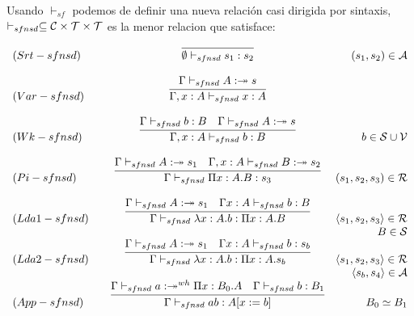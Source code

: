 \begin{definition}
Usando $\vdash_{sf}$ podemos de definir una nueva relación casi dirigida por sintaxis, $\vdash_{sfnsd} \subseteq \mathcal{C}\times\mathcal{T}\times\mathcal{T}$ es la
menor relacion que satisface:


\[
\begin{array}{llcr}
	(Srt-sfnsd) & &\infer{\emptyset \vdash_{sfnsd} s_{1} : s_{2}}{} & (s_{1},s_{2}) \in\cA \\ \\
	(Var-sfnsd) & &\infer{\Gamma, x:A \vdash_{sfnsd} x:A}{\Gamma\vdash_{sfnsd} A:\twoheadrightarrow s} & \\ \\
	(Wk-sfnsd)  & &\infer{\Gamma, x:A \vdash_{sfnsd} b:B}{\Gamma\vdash_{sfnsd} b:B & \Gamma\vdash_{sfnsd} A:\twoheadrightarrow s} & b\in\cS\cup\cV \\ \\
	(Pi-sfnsd)  & &\infer{\Gamma \vdash_{sfnsd} \Pi x:A.B : s_{3}}{\Gamma\vdash_{sfnsd} A:\twoheadrightarrow s_{1} & \Gamma, x:A \vdash_{sfnsd} B:\twoheadrightarrow s_{2}} &  (s_1,s_2,s_3)\in\cR\\ \\

	(Lda1-sfnsd) & &\infer{\Gamma \vdash_{sfnsd} \lambda x:A.b : \Pi x:A.B}{\Gamma \vdash_{sfnsd} A:\twoheadrightarrow s_1& \Gamma x:A \vdash_{sfnsd} b : B} & \langle s_1,s_2,s_3 \rangle \in \cR  \\  
	          & &                                                                                                             & B \in \cS  \\ 
	(Lda2-sfnsd) & &\infer{\Gamma \vdash_{sfnsd} \lambda x:A.b : \Pi x:A.s_b}{\Gamma \vdash_{sfnsd} A:\twoheadrightarrow s_1& \Gamma x:A \vdash_{sfnsd} b : s_b} & \langle s_1,s_2,s_3 \rangle \in \cR \\ 
	          & &                                                                                                             & \langle s_b, s_4 \rangle \in \cA  \\ 

	(App-sfnsd) & &\infer{\Gamma \vdash_{sfnsd} a b : A[x:= b] }{\Gamma\vdash_{sfnsd} a : \twoheadrightarrow^{wh} \Pi x:B_0 .A & \Gamma \vdash_{sfnsd} b:B_1} & B_0 \simeq B_1  \\ \\
	
\end{array}
\]



\end{definition}

